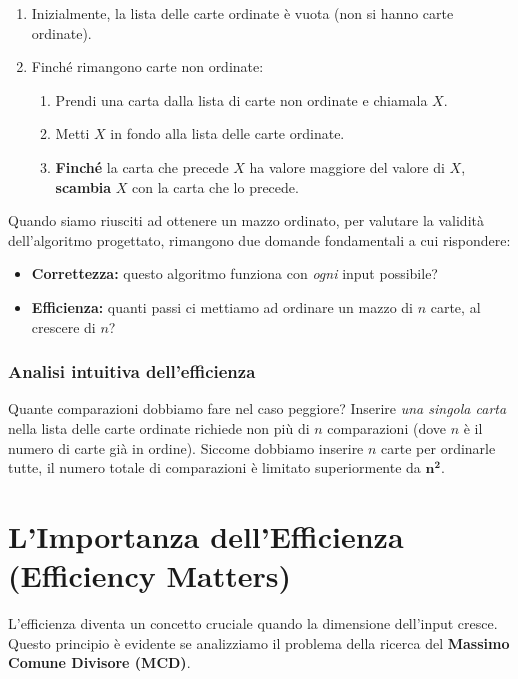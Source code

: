 \documentclass[openany,a4paper,12pt]{book}
\begin{document}
\begin{enumerate}
    \item Inizialmente, la lista delle carte ordinate è vuota (non si hanno carte ordinate).
    \item Finché rimangono carte non ordinate:
    \begin{enumerate}[label=\arabic*.\arabic*]
        \item Prendi una carta dalla lista di carte non ordinate e chiamala $X$.
        \item Metti $X$ in fondo alla lista delle carte ordinate.
        \item \textbf{Finché} la carta che precede $X$ ha valore maggiore del valore di $X$, \textbf{scambia} $X$ con la carta che lo precede.
    \end{enumerate}
\end{enumerate}

\begin{nota}
Quando siamo riusciti ad ottenere un mazzo ordinato, per valutare la validità dell'algoritmo progettato, rimangono due domande fondamentali a cui rispondere:
\begin{itemize}
    \item \textbf{Correttezza:} questo algoritmo funziona con \textit{ogni} input possibile?
    \item \textbf{Efficienza:} quanti passi ci mettiamo ad ordinare un mazzo di $n$ carte, al crescere di $n$?
\end{itemize}
\end{nota}

\subsubsection*{Analisi intuitiva dell'efficienza}
Quante comparazioni dobbiamo fare nel caso peggiore? Inserire \textit{una singola carta} nella lista delle carte ordinate richiede non più di $n$ comparazioni (dove $n$ è il numero di carte già in ordine). Siccome dobbiamo inserire $n$ carte per ordinarle tutte, il numero totale di comparazioni è limitato superiormente da $\mathbf{n^2}$.


\section{L'Importanza dell'Efficienza (Efficiency Matters)}

L'efficienza diventa un concetto cruciale quando la dimensione dell'input cresce. Questo principio è evidente se analizziamo il problema della ricerca del \textbf{Massimo Comune Divisore (MCD)}.
\end{document}
